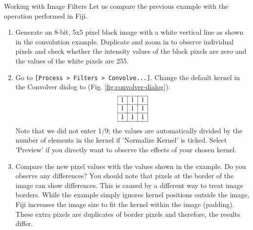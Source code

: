 \newpage
\begin{taskbox}{Working with Image Filters}
Let us compare the previous example with the operation performed in Fiji.

\begin{enumerate}
	\item Generate an 8-bit, 5x5 pixel black image with a white vertical line as shown in the convolution example. Duplicate and zoom in to observe individual pixels and check whether the intensity values of the black pixels are zero and the values of the white pixels are 255.
	\item Go to \texttt{[Process > Filters > Convolve...]}. Change the default kernel in the Convolver dialog to (Fig. \ref{fig:convolver-dialog}): 
	\[
		\begin{array}{|c|c|c|}
	\hline
	1&1&1\\
\hline
1&1&1\\
\hline
1&1&1\\
\hline
	\end{array}
\]
	Note that we did not enter 1/9; the values are automatically divided by the number of elements in the kernel if 'Normalize Kernel' is ticked. Select 'Preview' if you directly want to observe the effects of your chosen kernel.
	
	\begin{minipage}[t]{\linewidth}
		\begin{center}
		\medskip
		\label{fig:convolver-dialog}
		\end{center}
	\end{minipage}
	
	\item Compare the new pixel values with the values shown in the example. Do you observe any differences? You should note that pixels at the border of the image can show differences. This is caused by a different way to treat image borders. While the example simply ignores kernel positions outside the image, Fiji increases the image size to fit the kernel within the image (padding). These extra pixels are duplicates of border pixels and therefore, the results differ.
	
	\end{enumerate}
\end{taskbox}


